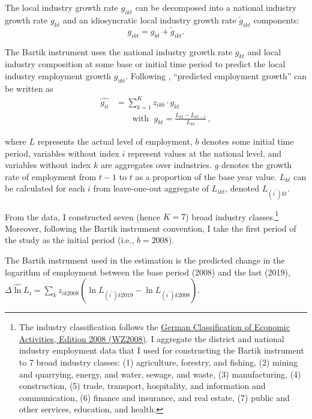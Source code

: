 \documentclass[
  12pt,
]{article}
\begin{document}
The local industry growth rate \(g_{ikt}\) can be decomposed into a national industry growth rate \(g_{kt}\) and an idiosyncratic local industry growth rate \(\widetilde{g}_{ikt}\) components: \[g_{ikt} = g_{kt} + \widetilde{g}_{ikt}.\]

The Bartik instrument uses the national industry growth rate \(g_{kt}\) and local industry composition at some base or initial time period to predict the local industry employment growth \(g_{ikt}\). Following \citet{bartik1991}, ``predicted employment growth'' can be written as \[
\begin{aligned}
\widehat{g_{it}} &=\sum_{k=1}^K z_{ikb}\cdot g_{kt}\\
&\quad\quad\text{with }\;g_{kt} = \frac{L_{kt} - L_{kt-1}}{L_{kb}}\,,
\end{aligned}
\]

where \(L\) represents the actual level of employment, \(b\) denotes some initial time period, variables without index \(i\) represent values at the national level, and variables without index \(k\) are aggregates over industries. \(g\) denotes the growth rate of employment from \(t-1\) to \(t\) as a proportion of the base year value. \(L_{kt}\) can be calculated for each \(i\) from leave-one-out aggregate of \(L_{ikt}\), denoted \(L_{(i^\prime)kt}\).

From the data, I constructed seven (hence \(K=7\)) broad industry classes.\footnote{The industry classification follows the \href{https://www.destatis.de/DE/Methoden/Klassifikationen/Gueter-Wirtschaftsklassifikationen/klassifikation-wz-2008.html}{German Classification of Economic Activities, Edition 2008 (WZ2008)}. I aggregate the district and national industry employment data that I used for constructing the Bartik instrument to 7 broad industry classes: (1) agriculture, forestry, and fishing, (2) mining and quarrying, energy, and water, sewage, and waste, (3) manufacturing, (4) construction, (5) trade, transport, hospitality, and information and communication, (6) finance and insurance, and real estate, (7) public and other services, education, and health.} Moreover, following the Bartik instrument convention, I take the first period of the study as the initial period (i.e., \(b=2008\)).

The Bartik instrument used in the estimation is the predicted change in the logarithm of employment between the base period (2008) and the last (2019), \(\widehat{\Delta\ln L_i} = \sum_k{z_{ik2008} \left(\ln L_{(i^\prime)k2019}-\ln L_{(i^\prime)k2008}\right)}\).
\end{document}
